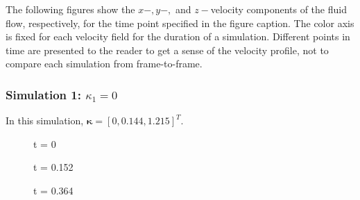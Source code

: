 \documentclass[paper=a4, fontsize=11pt]{scrartcl} %
\numberwithin{equation}{section} %
\numberwithin{figure}{section} %
\numberwithin{table}{section} %
\begin{document}
\par
The following figures show the $x-, y-,$ and $z-$velocity components of the fluid flow, respectively, for the time point specified in the figure caption. The color axis is fixed for each velocity field for the duration of a simulation. Different points in time are presented to the reader to get a sense of the velocity profile, not to compare each simulation from frame-to-frame.

\subsubsection{Simulation 1: $\kappa_1 = 0$}
In this simulation, $\bm{\kappa} = [0, 0.144, 1.215 ]^T$.

    \begin{figure}[h!]
        \centering
        \caption{t = 0}
        \label{fig:frame1_1}
    \end{figure}
    \begin{figure}[h!]
        \caption{t = 0.152}
        \label{fig:frame1_16}
    \end{figure}
    \begin{figure}[H]
        \caption{t = 0.364}
        \label{fig:frame1_37}
    \end{figure}
\end{document}
